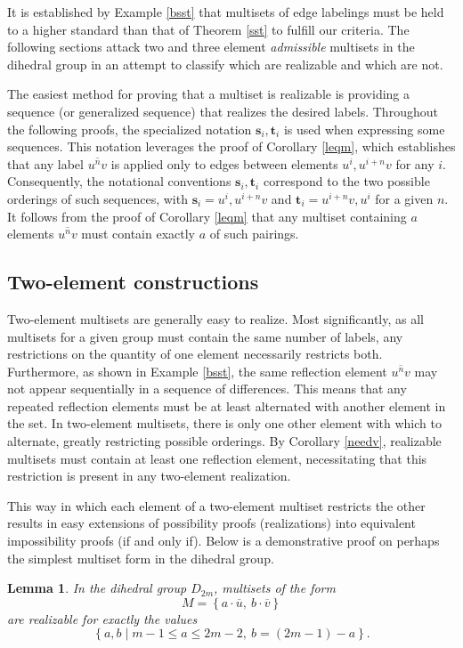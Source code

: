 \documentclass[12pt]{article}
\newtheorem{lem}[thm]{Lemma}
\newcommand{\setof}[1]{\left\{#1\right\}}
\newcommand{\setdef}[2]{\left\{#1\mid#2\right\}}
\newcommand{\ol}[1]{\overline{#1}} %
\newcommand{\bo}[1]{\textbf{#1}}%
\begin{document}
It is established by Example \ref{bsst} that multisets of edge labelings must be held
to a higher standard than that of Theorem \ref{sst} to fulfill our criteria.
The following sections attack two and three element \textit{admissible} multisets
in the dihedral group in an attempt to classify which are realizable and which are not.

The easiest method for proving that a multiset is realizable
is providing a sequence (or generalized sequence) that realizes the desired labels.
Throughout the following proofs, the specialized notation $\bo{s}_i, \bo{t}_i$ is used
when expressing some sequences. This notation leverages the proof of Corollary \ref{leqm},
which establishes that any label $\ol{u^nv}$ is applied only to edges between
elements $u^i, u^{i+n}v$ for any $i$. Consequently, the notational conventions
$\bo{s}_i, \bo{t}_i$ correspond to the two possible orderings of such sequences,
with $\bo{s}_i = u^i, u^{i+n}v$ and $\bo{t}_i = u^{i+n}v, u^i$ for a given $n$. It follows
from the proof of Corollary \ref{leqm} that any multiset containing $a$ elements $\ol{u^nv}$ must contain
exactly $a$ of such pairings.

\subsection{Two-element constructions}\label{sectwo}

Two-element multisets are generally easy to realize. Most significantly, as all multisets for a given group
must contain the same number of labels, any restrictions on the quantity of one element necessarily restricts
both. Furthermore, as shown in Example \ref{bsst},
the same reflection element $\ol{u^nv}$ may not appear sequentially in a sequence of differences.
This means that any repeated reflection elements must be at least alternated with another element in the set.
In two-element multisets, there is only one other element with which to alternate, greatly restricting possible orderings.
By Corollary \ref{needv}, realizable multisets must contain at least one reflection element,
necessitating that this restriction is present in any two-element realization.

This way in which each element of a two-element multiset restricts the other results in easy extensions of possibility
proofs (realizations) into equivalent impossibility proofs (if and only if). Below is a demonstrative proof on perhaps
the simplest multiset form in the dihedral group.

\begin{lem} \label{u+v} In the dihedral group $D_{2m}$, multisets of the form
$$M = \setof{a \cdot \ol{u},\ b \cdot \ol{v}}$$
are realizable for exactly the values
$$\setdef{a, b}{ m - 1 \leq a \leq 2m - 2,\ b = (2m - 1) - a}.$$
\end{lem}
\end{document}

